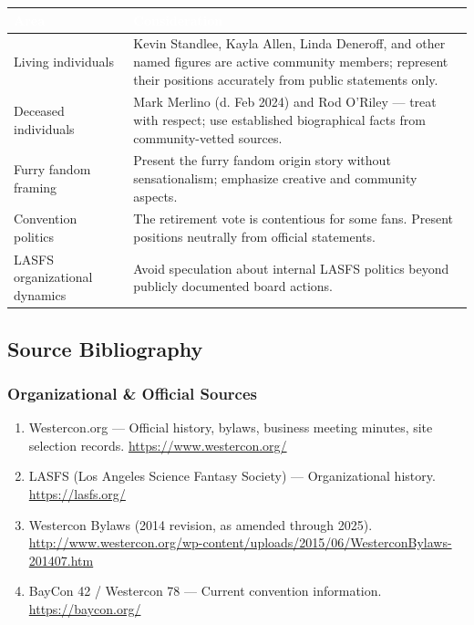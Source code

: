 \documentclass[11pt,letterpaper]{article}
\newcommand{\tableheader}[1]{\textbf{\sffamily\textcolor{white}{#1}}}
\begin{document}
\begin{center}
\begin{tabularx}{\textwidth}{L{3.5cm}X}
\toprule
{}
\tableheader{Area} & \tableheader{Consideration} \\
\midrule
Living individuals & Kevin Standlee, Kayla Allen, Linda Deneroff, and other named figures are active community members; represent their positions accurately from public statements only. \\
Deceased individuals & Mark Merlino (d. Feb 2024) and Rod O'Riley --- treat with respect; use established biographical facts from community-vetted sources. \\
Furry fandom framing & Present the furry fandom origin story without sensationalism; emphasize creative and community aspects. \\
Convention politics & The retirement vote is contentious for some fans. Present positions neutrally from official statements. \\
LASFS organizational dynamics & Avoid speculation about internal LASFS politics beyond publicly documented board actions. \\
\bottomrule
\end{tabularx}
\end{center}

\subsection{Source Bibliography}

\subsubsection{Organizational \& Official Sources}

\begin{enumerate}[leftmargin=2em]
  \item Westercon.org --- Official history, bylaws, business meeting minutes, site selection records. \url{https://www.westercon.org/}
  \item LASFS (Los Angeles Science Fantasy Society) --- Organizational history. \url{https://lasfs.org/}
  \item Westercon Bylaws (2014 revision, as amended through 2025). \url{http://www.westercon.org/wp-content/uploads/2015/06/WesterconBylaws-201407.htm}
  \item BayCon 42 / Westercon 78 --- Current convention information. \url{https://baycon.org/}
\end{enumerate}
\end{document}
